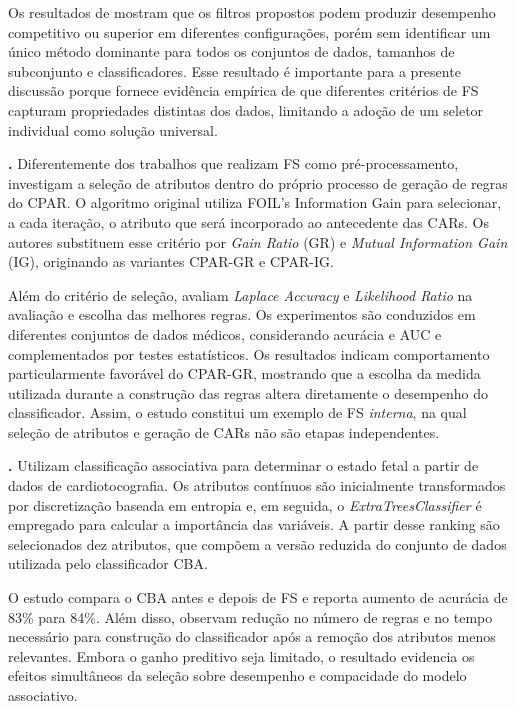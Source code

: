 Os resultados de  mostram que os filtros
propostos podem produzir desempenho competitivo ou superior em diferentes
configurações, porém sem identificar um único método dominante para todos os
conjuntos de dados, tamanhos de subconjunto e classificadores. Esse resultado é
importante para a presente discussão porque fornece evidência empírica de que
diferentes critérios de FS capturam propriedades distintas dos dados, limitando
a adoção de um seletor individual como solução universal.

\medskip

\noindent\textbf{.}
Diferentemente dos trabalhos que realizam FS como pré-processamento,
 investigam a seleção de atributos dentro do
próprio processo de geração de regras do CPAR. O algoritmo original utiliza
FOIL's Information Gain para selecionar, a cada iteração, o atributo que será
incorporado ao antecedente das CARs. Os autores substituem esse critério por
\textit{Gain Ratio} (GR) e \textit{Mutual Information Gain} (IG), originando as
variantes CPAR-GR e CPAR-IG.

Além do critério de seleção,  avaliam
\textit{Laplace Accuracy} e \textit{Likelihood Ratio} na avaliação e escolha das
melhores regras. Os experimentos são conduzidos em diferentes conjuntos de
dados médicos, considerando acurácia e AUC e complementados por testes
estatísticos. Os resultados indicam comportamento particularmente favorável do
CPAR-GR, mostrando que a escolha da medida utilizada durante a construção das
regras altera diretamente o desempenho do classificador. Assim, o estudo
constitui um exemplo de FS \textit{interna}, na qual seleção de atributos e
geração de CARs não são etapas independentes.

\medskip

\noindent\textbf{.}
Utilizam classificação associativa para determinar
o estado fetal a partir de dados de cardiotocografia. Os atributos contínuos são
inicialmente transformados por discretização baseada em entropia e, em seguida,
o \textit{ExtraTreesClassifier} é empregado para calcular a importância das
variáveis. A partir desse ranking são selecionados dez atributos, que compõem a
versão reduzida do conjunto de dados utilizada pelo classificador CBA.

O estudo compara o CBA antes e depois de FS e reporta aumento de acurácia de
83\% para 84\%. Além disso,  observam redução no
número de regras e no tempo necessário para construção do classificador após a
remoção dos atributos menos relevantes. Embora o ganho preditivo seja limitado,
o resultado evidencia os efeitos simultâneos da seleção sobre desempenho e
compacidade do modelo associativo.

